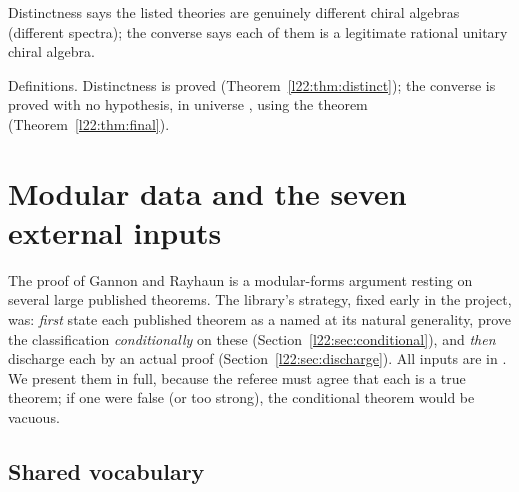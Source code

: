 \begin{physics}
Distinctness says the listed theories are genuinely different chiral algebras (different spectra); the
converse says each of them is a legitimate rational unitary chiral algebra.
\end{physics}

\begin{status}
Definitions. Distinctness is proved (Theorem~\ref{l22:thm:distinct}); the converse is proved with no hypothesis, in
universe , using the theorem  (Theorem~\ref{l22:thm:final}).
\end{status}

\section{Modular data and the seven external inputs}\label{l22:sec:inputs}

The proof of Gannon and Rayhaun is a modular-forms argument resting on several large published theorems.
The library's strategy, fixed early in the project, was: \emph{first} state each published theorem as a named
 at its natural generality, prove the classification \emph{conditionally} on these
(Section~\ref{l22:sec:conditional}), and \emph{then} discharge each  by an actual proof
(Section~\ref{l22:sec:discharge}). All inputs are in
. We present them in full,
because the referee must agree that each is a true theorem; if one were false (or too strong), the
conditional theorem would be vacuous.

\subsection{Shared vocabulary}

